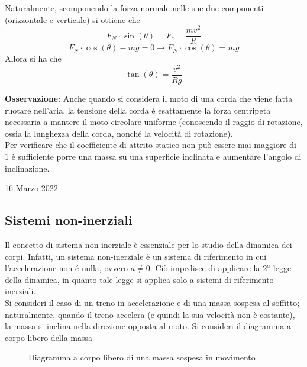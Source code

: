 \documentclass[a4paper]{extarticle}
\begin{document}
\vspace{1em}
\noindent
Naturalmente, scomponendo la forza normale nelle sue due componenti (orizzontale e verticale) si ottiene che
\[F_N \cdot \sin(\theta) = F_c = \frac{m v^2}{R}\]
\[F_N \cdot \cos(\theta) - mg = 0 \longrightarrow F_N \cdot \cos(\theta) = mg\]
Allora si ha che
\[\tan(\theta) = \frac{v^2}{R g}\]

\vspace{1em}
\noindent
\textbf{Osservazione}: Anche quando si considera il moto di una corda che viene fatta ruotare nell'aria, la tensione della corda è esattamente la forza centripeta necessaria a mantere il moto circolare uniforme (conoscendo il raggio di rotazione, ossia la lunghezza della corda, nonché la velocità di rotazione).\\
Per verificare che il coefficiente di attrito statico non può essere mai maggiore di $1$ è sufficiente porre una massa su una superficie inclinata e aumentare l'angolo di inclinazione.\\

\newpage
\noindent
\begin{center}
  16 Marzo 2022
\end{center}
\subsection{Sistemi non-inerziali}
Il concetto di sistema non-inerziale è essenziale per lo studio della dinamica dei corpi. Infatti, un sistema non-inerziale è un sistema di riferimento in cui l'accelerazione non é nulla, ovvero $a \neq 0$. Ciò impedisce di applicare la $2^a$ legge della dinamica, in quanto tale legge si applica solo a sistemi di riferimento inerziali.\\
Si consideri il caso di un treno in accelerazione e di una massa sospesa al soffitto; naturalmente, quando il treno accelera (e quindi la sua velocità non è costante), la massa si inclina nella direzione opposta al moto. Si consideri il diagramma a corpo libero della massa

\vspace{1em}
\begin{figure}[H]
  \centering
  \caption{Diagramma a corpo libero di una massa sospesa in movimento}
  \label{fig:diagramma_corpo_libero_massa_sospesa}
\end{figure}
\end{document}
